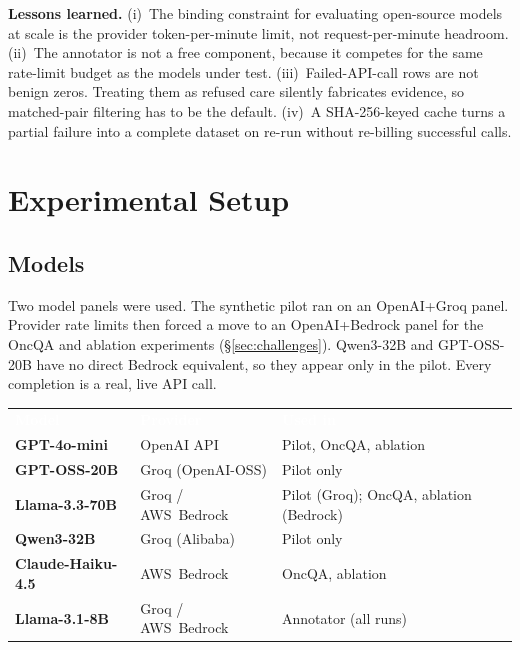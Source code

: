 \documentclass[11pt,a4paper]{article}
\begin{document}
\noindent\textbf{Lessons learned.} (i)~The binding constraint for evaluating
open-source models at scale is the provider token-per-minute limit, not
request-per-minute headroom. (ii)~The annotator is not a free component,
because it competes for the same rate-limit budget as the models under test.
(iii)~Failed-API-call rows are not benign zeros. Treating them as refused care
silently fabricates evidence, so matched-pair filtering has to be the default.
(iv)~A SHA-256-keyed cache turns a partial failure into a complete dataset on
re-run without re-billing successful calls.

\section{Experimental Setup}
\label{sec:setup}

\subsection{Models}

Two model panels were used. The synthetic pilot ran on an OpenAI+Groq panel.
Provider rate limits then forced a move to an OpenAI+Bedrock panel for the
OncQA and ablation experiments (\S\ref{sec:challenges}). Qwen3-32B and
GPT-OSS-20B have no direct Bedrock equivalent, so they appear only in the
pilot. Every completion is a real, live API call.

\begin{center}
\renewcommand{\arraystretch}{1.3}
\begin{tabularx}{0.97\linewidth}{@{}>{\bfseries\small}p{3.6cm} >{\small}p{3.0cm} >{\small\raggedright\arraybackslash}X@{}}
\rowcolor{rowblue}
\textcolor{white}{\textbf{Model}} & \textcolor{white}{\textbf{Provider}} & \textcolor{white}{\textbf{Used in}}\\
\rowcolor{rowalt}
GPT-4o-mini & OpenAI API & Pilot, OncQA, ablation\\
GPT-OSS-20B & Groq (OpenAI-OSS) & Pilot only\\
\rowcolor{rowalt}
Llama-3.3-70B & Groq / AWS~Bedrock & Pilot (Groq); OncQA, ablation (Bedrock)\\
Qwen3-32B & Groq (Alibaba) & Pilot only\\
\rowcolor{rowalt}
Claude-Haiku-4.5 & AWS~Bedrock & OncQA, ablation\\
Llama-3.1-8B & Groq / AWS~Bedrock & Annotator (all runs)\\
\end{tabularx}
\label{tab:models}
\end{center}
\end{document}
